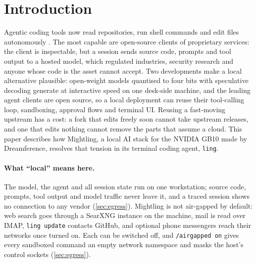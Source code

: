 \documentclass[11pt]{article}
\newcommand{\code}[1]{\texttt{#1}}
\begin{document}
\section{Introduction}

Agentic coding tools now read repositories, run shell commands and edit files autonomously
\cite{yao2023react,yang2024sweagent,wang2024openhands}. The most capable are open-source clients of
proprietary services: the client is inspectable, but a session sends source code, prompts and tool
output to a hosted model, which regulated industries, security research and anyone whose code is
the asset cannot accept. Two developments make a local alternative plausible: open-weight models
quantised to four bits \cite{frantar2022gptq,lin2023awq,cheng2023autoround,nvfp4blog} with
speculative decoding \cite{leviathan2023speculative,chen2023speculative,chen2026dflash} generate at
interactive speed on one desk-side machine, and the leading agent clients are open source, so a
local deployment can reuse their tool-calling loop, sandboxing, approval flows and terminal UI.
Reusing a fast-moving upstream has a cost: a fork that edits freely soon cannot take upstream
releases, and one that edits nothing cannot remove the parts that assume a cloud. This paper
describes how Mightling, a local AI stack for the NVIDIA GB10 made by Dreamference, resolves that
tension in its terminal coding agent, \code{ling}.

\paragraph{What ``local'' means here.} The model, the agent and all session state run on one
workstation; source code, prompts, tool output and model traffic never leave it, and a traced
session shows no connection to any vendor (\cref{sec:egress}). Mightling is not air-gapped by
default: web search goes through a SearXNG \cite{searxng} instance on the machine, mail is read
over IMAP, \code{ling update} contacts GitHub, and optional phone messengers reach
their networks once turned on. Each can be switched off, and \code{/airgapped on} gives every
sandboxed command an empty network namespace and masks the host's control sockets (\cref{sec:egress}).
\end{document}
